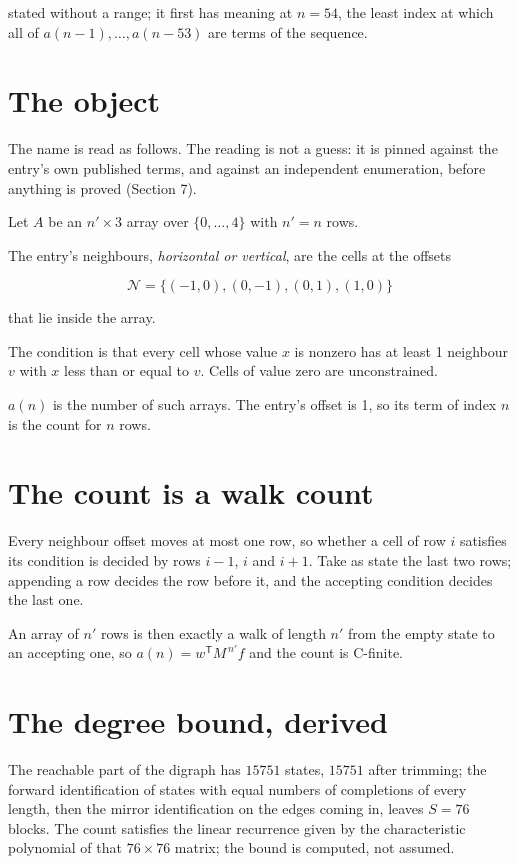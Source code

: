 \documentclass[11pt]{article}
\theoremstyle{definition}
\begin{document}
stated without a range; it first has meaning at $n = 54$, the least index at which all of $a(n-1),\dots,a(n-53)$ are terms of the sequence.

\section{The object}

The name is read as follows. The reading is not a guess: it is pinned against the entry's own published terms, and against an independent enumeration, before anything is proved (Section 7).

Let $A$ be an $n' \times 3$ array over $\{0,\dots,4\}$ with $n' = n$ rows.

The entry's neighbours, {\itshape horizontal or vertical}, are the cells at the offsets

\[\mathcal{N} = \{(-1,0), (0,-1), (0,1), (1,0)\}\]

that lie inside the array.

The condition is that every cell whose value $x$ is nonzero has at least 1 neighbour $v$ with $x$ less than or equal to $v$. Cells of value zero are unconstrained.

$a(n)$ is the number of such arrays. The entry's offset is 1, so its term of index $n$ is the count for $n$ rows.

\section{The count is a walk count}

Every neighbour offset moves at most one row, so whether a cell of row $i$ satisfies its condition is decided by rows $i-1$, $i$ and $i+1$. Take as state the last two rows; appending a row decides the row before it, and the accepting condition decides the last one.

An array of $n'$ rows is then exactly a walk of length $n'$ from the empty state to an accepting one, so $a(n) = w^{\mathsf T}M^{\,n'}f$ and the count is C-finite.

\section{The degree bound, derived}

The reachable part of the digraph has $15751$ states, $15751$ after trimming; the forward identification of states with equal numbers of completions of every length, then the mirror identification on the edges coming in, leaves $S = 76$ blocks. The count satisfies the linear recurrence given by the characteristic polynomial of that $76\times76$ matrix; the bound is computed, not assumed.
\end{document}
